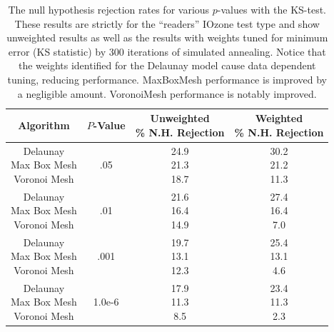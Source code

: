 \begin{table}
  \centering
  \begin{tabular}{c|c|c|c}
    \hline
    \textbf{Algorithm} & \textbf{$P$-Value} & \multilinecell{\textbf{Unweighted}\\\textbf{\% N.H. Rejection}} & \multilinecell{\textbf{Weighted}\\\textbf{\% N.H. Rejection}}\\
    \hline
    \multilinecell{Delaunay\\Max Box Mesh\\Voronoi Mesh} & .05 & \multilinecell{24.9\\21.3\\18.7} & \multilinecell{30.2\\21.2\\11.3}\\
    \hline
    \multilinecell{Delaunay\\Max Box Mesh\\Voronoi Mesh} & .01 & \multilinecell{21.6\\16.4\\14.9} & \multilinecell{27.4\\16.4\\7.0}\\
    \hline
    \multilinecell{Delaunay\\Max Box Mesh\\Voronoi Mesh} & .001 & \multilinecell{19.7\\13.1\\12.3} & \multilinecell{25.4\\13.1\\4.6}\\
    \hline
    \multilinecell{Delaunay\\Max Box Mesh\\Voronoi Mesh} & 1.0e-6 & \multilinecell{17.9\\11.3\\8.5} & \multilinecell{23.4\\11.3\\2.3}\\
    \hline
  \end{tabular}
  \caption{The null hypothesis rejection rates for various $p$-values with the KS-test. These results are strictly for the ``readers'' IOzone test type and show unweighted results as well as the results with weights tuned for minimum error (KS statistic) by 300 iterations of simulated annealing. Notice that the weights identified for the Delaunay model cause data dependent tuning, reducing performance. MaxBoxMesh performance is improved by a negligible amount. VoronoiMesh performance is notably improved.}
  \label{tab:optimized_p_value_failure_rate}
\end{table}


